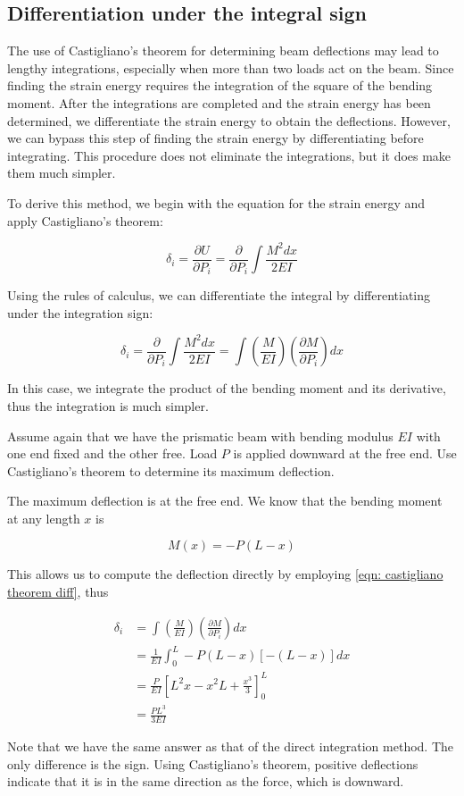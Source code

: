 \documentclass[
fontsize=10pt,
a4paper,
twosides=false,
open=any,
svgnames,
]{kaobook} %
\begin{document}
\subsection{Differentiation under the integral sign}

The use of Castigliano’s theorem for determining beam deflections may lead to lengthy integrations, especially when more than two loads act on the beam. Since finding the strain energy requires the integration of the square of the bending moment. After the integrations are completed and the strain energy has been determined, we differentiate the strain energy to obtain the deflections. However, we can bypass this step of finding the strain energy by differentiating before integrating. This procedure does not eliminate the integrations, but it does make them much simpler.

To derive this method, we begin with the equation for the strain energy and apply Castigliano’s theorem:

\[\delta _i = \frac{\partial U}{\partial P_i} = \frac{\partial }{\partial P_i}\int \frac{M^2dx}{2EI} \]

Using the rules of calculus, we can differentiate the integral by differentiating under the integration sign:

\begin{equation} \label{eqn: castigliano theorem diff}
  \delta _i = \frac{\partial }{\partial P_i}\int \frac{M^2dx}{2EI}  = \int \left( \frac{M}{EI} \right) \left( \frac{\partial M}{\partial P_i} \right)dx
\end{equation}

In this case, we integrate the product of the bending moment and its derivative, thus the integration is much simpler.

\begin{example}
Assume again that we have the prismatic beam with bending modulus $EI$ with one end fixed and the other free. Load $P$ is applied downward at the free end. Use Castigliano’s theorem to determine its maximum deflection.

The maximum deflection is at the free end. We know that the bending moment at any length $x$ is

\[M(x) =  - P(L - x)\]

This allows us to compute the deflection directly by employing \cref{eqn: castigliano theorem diff}, thus

\begin{align*}
  \delta_i &= \int \left( \frac{M}{EI} \right)\left( \frac{\partial M}{\partial P_i} \right)dx \\ 
              &= \frac{1}{EI}\int_0^L - P(L - x)[ - (L - x)]dx  \\ 
              &= \frac{P}{EI}\left[ L^2x - x^2L + \frac{x^3}{3} \right]_0^L \\ 
              &= \frac{PL^3}{3EI} 
\end{align*}	

Note that we have the same answer as that of the direct integration method. The only difference is the sign. Using Castigliano's theorem, positive deflections indicate that it is in the same direction as the force, which is downward.
\end{example}
\end{document}
